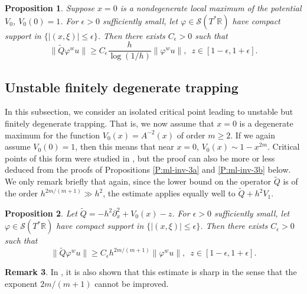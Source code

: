 \documentclass[twoside, final]{amsart}
\newtheorem{proposition}{Proposition}[section]
\theoremstyle{definition}
\newtheorem{remark}[proposition]{Remark}
\numberwithin{equation}{section}
\begin{document}
\begin{proposition}
\label{P:ml-inv-0}
Suppose $x = 0$ is a nondegenerate local maximum of the potential $V_0$,
$V_0(0) = 1$.  For 
$\epsilon>0$ sufficiently small, let ${\varphi} \in {{\mathcal S}}(T^* {{\mathbb R}})$
have compact support in $\{ |(x,\xi) |{\leqslant} \epsilon\}$.  Then there
exists $C_\epsilon>0$ such that 
\begin{equation}
\label{E:ml-inv-0}
\| {\widetilde{Q}} {\varphi}^w u \| {\geqslant} C_\epsilon \frac{h}{\log(1/h)} \|
{\varphi}^w u \|, \,\,\, z \in [1-\epsilon, 1 + \epsilon].
\end{equation}
\end{proposition}

\subsection{Unstable finitely degenerate trapping}

\label{SS:unst-fin}

In this subsection, we consider an isolated critical point leading to
unstable but finitely degenerate trapping.  That is, we now assume
that $x = 0$ is a degenerate maximum for the function $V_0(x) = A^{-2}(x)$ of order
$m {\geqslant} 2$.  If we again assume $V_0(0) = 1$, then this means that near
$x = 0$, $V_0(x) \sim 1 - x^{2m}$.  Critical points of this form were
studied in \cite{ChWu-lsm}, but the proof can also be more or less
deduced from the proofs of Propositions \ref{P:ml-inv-3a} and
\ref{P:ml-inv-3b} below.
We only
remark briefly that again, since the lower bound on the operator ${\widetilde{Q}}$
is of the order $h^{2m/(m+1)} \gg h^2$, the estimate applies equally
well to ${\widetilde{Q}} + h^2 V_1$.

\begin{proposition}
\label{P:ml-inv-1}
Let ${\widetilde{Q}} = -h^2 {\partial}_x^2 + V_0(x) -z$.  For $\epsilon>0$ sufficiently small, let ${\varphi} \in {{\mathcal S}}(T^* {{\mathbb R}})$
have compact support in $\{ |(x,\xi) |{\leqslant} \epsilon\}$.  Then there
exists $C_\epsilon>0$ such that 
\begin{equation}
\label{E:ml-inv-1}
\| {\widetilde{Q}} {\varphi}^w u \| {\geqslant} C_\epsilon h^{2m/(m+1)} \|
{\varphi}^w u \|, \,\,\, z \in [1-\epsilon, 1 + \epsilon].
\end{equation}
\end{proposition}

\begin{remark}
In \cite{ChWu-lsm}, it is also shown that this estimate is sharp in
the sense that the exponent $2m/(m+1)$ cannot be improved.

\end{remark}
\end{document}
